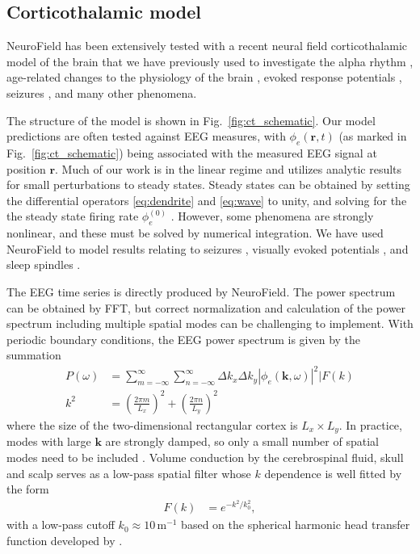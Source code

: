 \documentclass[preprint,review,10pt,authoryear,letterpaper]{elsarticle}
\begin{document}
\subsection{Corticothalamic model}
\label{sec:ct}

NeuroField has been extensively tested with a recent neural field corticothalamic model of the brain \citep{Robinson2005,Rowe2004413,PhysRevE.63.021903,PhysRevE.65.041924,Robinson:04aa} that we have previously used to investigate the alpha rhythm \citep{PhysRevE.68.021922,PhysRevE.70.011911}, age-related changes to the physiology of the brain \citep{VanAlbada2010}, evoked response potentials \citep{Rennie2002,ker11}, seizures \citep{Breakspear2006}, and many other phenomena. 

The structure of the model is shown in Fig.~\ref{fig:ct_schematic}. 
Our model predictions are often tested against EEG measures, with $\phi_e(\mathbf{r},t)$ (as marked in Fig.~\ref{fig:ct_schematic}) being associated with the measured EEG signal at position $\mathbf{r}$. 
Much of our work is in the linear regime and utilizes analytic results for small perturbations to steady states. Steady states can be obtained by setting the differential operators \eqref{eq:dendrite} and \eqref{eq:wave} to unity, and solving for the the steady state firing rate $\phi_e^{(0)}$ \cite{Robinson:04aa}. 
However, some phenomena are strongly nonlinear, and these must be solved by numerical integration. We have used NeuroField to model results relating to seizures \citep{Roberts2008}, visually evoked potentials \citep{Roberts2012a}, and sleep spindles \citep{Abeysuriya2013,Abeysuriya2013a}.  

The EEG time series is directly produced by NeuroField. 
The power spectrum can be obtained by FFT, but correct normalization and calculation of the power spectrum including multiple spatial modes can be challenging to implement. With periodic boundary conditions, the EEG power spectrum is given by the summation
\begin{align}
\label{eqn:power_sum}
P(\omega) &= \sum_{m = -\infty}^{\infty}\sum_{n = -\infty}^{\infty} \Delta k_x \Delta k_y |\phi_e(\mathbf{k},\omega)|^2|F(k)\\
k^2 &=  \left( \frac{2\pi m}{L_x} \right)^2 + \left( \frac{2\pi n}{L_y}\right)^2
\end{align}
where the size of the two-dimensional rectangular cortex is $L_x \times L_y$. In practice, modes with large $\mathbf{k}$ are strongly damped, so only a small number of spatial modes need to be included \citep{OConnor2002}. Volume conduction by the cerebrospinal fluid, skull and scalp serves as a low-pass spatial filter whose $k$ dependence is well fitted by the form \citep{PhysRevE.63.021903,Rowe2004413,alb06a,VanAlbada2010}
\begin{align}
F(k) &= e^{-k^2/k_0^2},
\end{align}
with a low-pass cutoff $k_0 \approx 10$\,m$^{-1}$ based on the spherical harmonic head transfer function developed by \cite{Srinivasan1998}.
\end{document}
